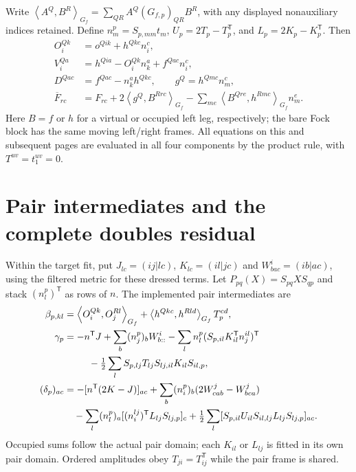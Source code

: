 \documentclass[10pt,letterpaper]{article}
\newcommand{\T}{^{\mathsf T}}
\newcommand{\uv}{^{uv}}
\newcommand{\ip}[2]{\left\langle #1,#2\right\rangle}
\newcommand{\sectionpage}[1]{\newpage\section{#1}}
\begin{document}
Write $\ip{A^Q}{B^R}_{G_f}=\sum_{QR}A^Q(G_{f,p})_{QR}B^R$, with any displayed nonauxiliary indices retained. Define $n_m^p=S_{p,mm}t_m$, $U_p=2T_p-T_p\T$, and $L_p=2K_p-K_p\T$. Then
\begin{align}
O_i^{Qk}&=o^{Qik}+h^{Qkc}n_i^c,\\
V_i^{Qa}&=h^{Qia}-O_i^{Qk}n_k^a+f^{Qac}n_i^c,\\
D^{Qac}&=f^{Qac}-n_k^a h^{Qkc},\qquad g^Q=h^{Qmc}n_m^c,\\
\overline F_{rc}&=F_{rc}+2\ip{g^Q}{B^{Rrc}}_{G_f}
 -\sum_{me}\ip{B^{Qre}}{h^{Rmc}}_{G_f}n_m^e.
\end{align}
Here $B=f$ or $h$ for a virtual or occupied left leg, respectively; the bare Fock block has the same moving left/right frames. All equations on this and subsequent pages are evaluated in all four components by the product rule, with $T\uv=t_1\uv=0$.

\sectionpage{Pair intermediates and the complete doubles residual}
Within the target fit, put $J_{lc}=(ij|lc)$, $K_{lc}=(il|jc)$ and $W^i_{bac}=(ib|ac)$, using the filtered metric for these dressed terms. Let $P_{pq}(X)=S_{pq}XS_{qp}$ and stack $(n_l^p)\T$ as rows of $n$. The implemented pair intermediates are
\begin{align}
\beta_{p,kl}&=\ip{O_i^{Qk}}{O_j^{Rl}}_{G_f}
 +\ip{h^{Qkc}}{h^{Rld}}_{G_f}T_p^{cd},\\
\gamma_p&=-n\T J+\sum_b(n_j^p)_bW^i_{b::}
 -\sum_l n_l^p(S_{p,il}K_{il}\T n_j^{il})\T\notag\\
&\hspace{9mm}-\tfrac12\sum_l S_{p,lj}T_{lj}S_{lj,il}K_{il}S_{il,p},\\
(\delta_p)_{ac}&=-[n\T(2K-J)]_{ac}
 +\sum_b(n_i^p)_b(2W^j_{cab}-W^j_{bca})\notag\\
&\quad-\sum_l(n_l^p)_a[(n_i^{lj})\T L_{lj}S_{lj,p}]_c
 +\tfrac12\sum_l[S_{p,il}U_{il}S_{il,lj}L_{lj}S_{lj,p}]_{ac}.
\end{align}
Occupied sums follow the actual pair domain; each $K_{il}$ or $L_{lj}$ is fitted in its own pair domain. Ordered amplitudes obey $T_{ji}=T_{ij}\T$ while the pair frame is shared.
\end{document}
